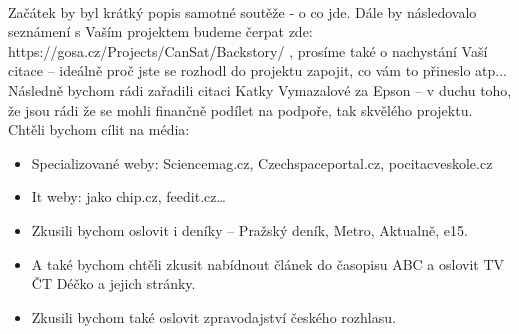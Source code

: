 \documentclass[a4paper]{report}
\begin{document}
\paragraph{} Začátek by byl krátký popis samotné soutěže - o co jde. Dále by následovalo seznámení s Vaším projektem budeme čerpat zde: https://gosa.cz/Projects/CanSat/Backstory/ , prosíme také o nachystání Vaší citace – ideálně proč jste se rozhodl do projektu zapojit, co vám to přineslo atp... Následně bychom rádi zařadili citaci Katky Vymazalové za Epson – v duchu toho, že jsou rádi že se mohli finančně podílet na podpoře, tak skvělého projektu.
Chtěli bychom cílit na média:\\
\begin{itemize}
    \item Specializované weby: Sciencemag.cz, Czechspaceportal.cz, pocitacveskole.cz
    \item It weby: jako chip.cz, feedit.cz…
    \item Zkusili bychom oslovit i deníky – Pražský deník, Metro, Aktualně, e15.
    \item A také bychom chtěli zkusit nabídnout článek do časopisu ABC a oslovit TV ČT Déčko a jejich stránky.
    \item Zkusili bychom také oslovit zpravodajství českého rozhlasu.
\end{itemize}
\end{document}
